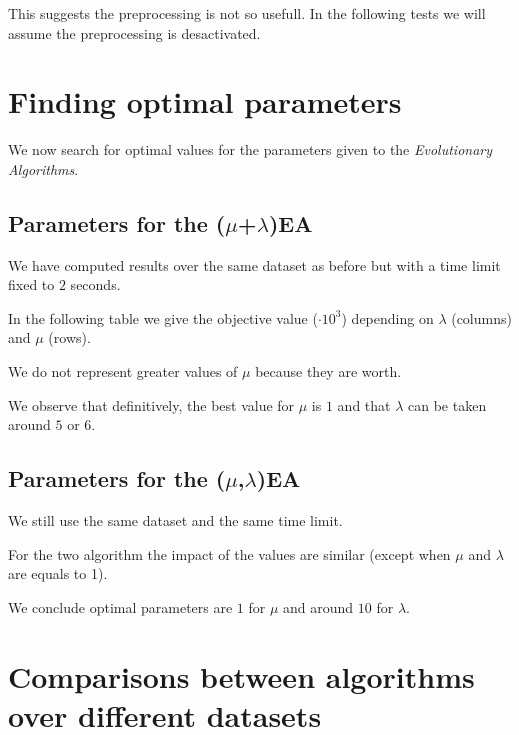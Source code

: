 \documentclass[a4paper]{article}
\begin{document}
This suggests the preprocessing is not so usefull. In the following tests we will assume the preprocessing is desactivated.

\section{Finding optimal parameters}

We now search for optimal values for the parameters given to the \textit{Evolutionary Algorithms}.

\subsection{Parameters for the ($\mu$+$\lambda$)EA}

We have computed results over the same dataset as before but with a time limit fixed to $2$ seconds.

In the following table we give the objective value ($\cdot 10^3$) depending on $\lambda$ (columns) and $\mu$ (rows). 

\begin{center}
\end{center}


We do not represent greater values of $\mu$ because they are worth.

We observe that definitively, the best value for $\mu$ is $1$ and that $\lambda$ can be taken around $5$ or $6$.


\subsection{Parameters for the ($\mu$,$\lambda$)EA}

We still use the same dataset and the same time limit.

\begin{center}
\end{center}

For the two algorithm the impact of the values are similar (except when $\mu$ and $\lambda$ are equals to 1).

We conclude optimal parameters are $1$ for $\mu$ and around $10$ for $\lambda$.

\section{Comparisons between algorithms over different datasets}

\begin{center}
\end{center}
\end{document}
